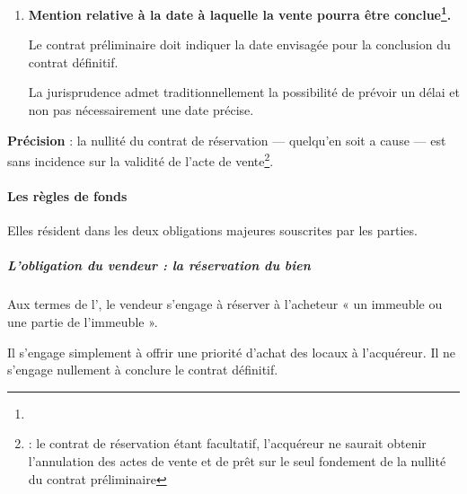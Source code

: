 \begin{enumerate}
\begin{citationArticle}[R]{261-31}{\cch}
						Sous réserve de la justification par le déposant de son droit à restitution, le remboursement intervient dans le délai maximum de trois mois à dater de cette demande
						\end{citationArticle}


						\item \textbf{Mention relative à la date à laquelle la vente pourra être conclue\footnote{}.}

						Le contrat préliminaire doit indiquer la date envisagée pour la conclusion du contrat définitif.

						La jurisprudence admet traditionnellement la possibilité de prévoir un délai et non pas nécessairement une date précise.
					\end{enumerate}

				\textbf{Précision} : la nullité du contrat de réservation --– quelqu’en soit a cause --- est sans incidence sur la validité de l’acte de vente\footnote{  : le contrat de réservation étant facultatif, l’acquéreur ne saurait obtenir l’annulation des actes de vente et de prêt sur le seul fondement de la nullité du contrat préliminaire}.

			\paragraph{Les règles de fonds}

				Elles résident dans les deux obligations majeures souscrites par les parties.

				\subparagraph{L'obligation du vendeur : la réservation du bien}

					Aux termes de l’, le vendeur s’engage à réserver à l’acheteur « un immeuble ou une partie de l’immeuble ».

					Il s’engage simplement à offrir une priorité d’achat des locaux à l’acquéreur.
					Il ne s’engage nullement à conclure le contrat définitif.


